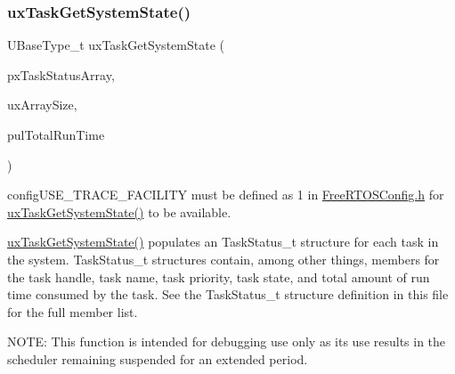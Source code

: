 \subsubsection{\texorpdfstring{ux\+Task\+Get\+System\+State()}{uxTaskGetSystemState()}}
{\footnotesize\ttfamily U\+Base\+Type\+\_\+t ux\+Task\+Get\+System\+State (\begin{DoxyParamCaption}\item[{Task\+Status\+\_\+t $\ast$const}]{px\+Task\+Status\+Array,  }\item[{const U\+Base\+Type\+\_\+t}]{ux\+Array\+Size,  }\item[{uint32\+\_\+t $\ast$const}]{pul\+Total\+Run\+Time }\end{DoxyParamCaption})}

config\+U\+S\+E\+\_\+\+T\+R\+A\+C\+E\+\_\+\+F\+A\+C\+I\+L\+I\+TY must be defined as 1 in \hyperlink{_free_r_t_o_s_config_8h_source}{Free\+R\+T\+O\+S\+Config.\+h} for \hyperlink{group___tasks_gaa4603f3de3d809e9beb18d10fbac005d}{ux\+Task\+Get\+System\+State()} to be available.

\hyperlink{group___tasks_gaa4603f3de3d809e9beb18d10fbac005d}{ux\+Task\+Get\+System\+State()} populates an Task\+Status\+\_\+t structure for each task in the system. Task\+Status\+\_\+t structures contain, among other things, members for the task handle, task name, task priority, task state, and total amount of run time consumed by the task. See the Task\+Status\+\_\+t structure definition in this file for the full member list.

N\+O\+TE\+: This function is intended for debugging use only as its use results in the scheduler remaining suspended for an extended period.



